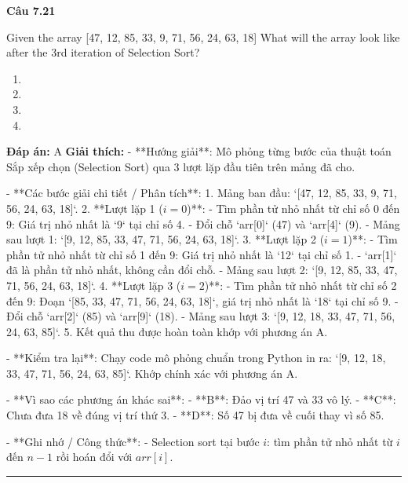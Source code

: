 \documentclass[11pt,a4paper]{article}
\newenvironment{question}[1]{%
  \par\vspace{1em}\noindent\textbf{\large Câu #1}\par\vspace{0.4em}
}{%
  \par\vspace{1em}\hrule\vspace{0.6em}
}
\newenvironment{choices}{%
  \begin{enumerate}[label=\textbf{\Alph*.},leftmargin=2.2em,itemsep=2pt,topsep=3pt]
}{%
  \end{enumerate}
}
\newcommand{\choice}{\item}
\begin{document}
\begin{question}{7.21}
Given the array [47, 12, 85, 33, 9, 71, 56, 24, 63, 18]
What will the array look like after the 3rd iteration of Selection Sort?
\begin{choices}
\choice [9, 12, 18, 33, 47, 71, 56, 24, 63, 85]
\choice [9, 12, 18, 47, 33, 71, 56, 24, 63, 85]
\choice [9, 12, 33, 18, 47, 71, 56, 24, 63, 85]
\choice [9, 12, 18, 33, 85, 71, 56, 24, 63, 47]
\end{choices}
\textbf{Đáp án:} A
\textbf{Giải thích:} - **Hướng giải**:
  Mô phỏng từng bước của thuật toán Sắp xếp chọn (Selection Sort) qua 3 lượt lặp đầu tiên trên mảng đã cho.

- **Các bước giải chi tiết / Phân tích**:
  1. Mảng ban đầu: `[47, 12, 85, 33, 9, 71, 56, 24, 63, 18]`.
  2. **Lượt lặp 1 (\(i = 0\))**:
     - Tìm phần tử nhỏ nhất từ chỉ số 0 đến 9: Giá trị nhỏ nhất là `9` tại chỉ số 4.
     - Đổi chỗ `arr[0]` (47) và `arr[4]` (9).
     - Mảng sau lượt 1: `[9, 12, 85, 33, 47, 71, 56, 24, 63, 18]`.
  3. **Lượt lặp 2 (\(i = 1\))**:
     - Tìm phần tử nhỏ nhất từ chỉ số 1 đến 9: Giá trị nhỏ nhất là `12` tại chỉ số 1.
     - `arr[1]` đã là phần tử nhỏ nhất, không cần đổi chỗ.
     - Mảng sau lượt 2: `[9, 12, 85, 33, 47, 71, 56, 24, 63, 18]`.
  4. **Lượt lặp 3 (\(i = 2\))**:
     - Tìm phần tử nhỏ nhất từ chỉ số 2 đến 9: Đoạn `[85, 33, 47, 71, 56, 24, 63, 18]`, giá trị nhỏ nhất là `18` tại chỉ số 9.
     - Đổi chỗ `arr[2]` (85) và `arr[9]` (18).
     - Mảng sau lượt 3: `[9, 12, 18, 33, 47, 71, 56, 24, 63, 85]`.
  5. Kết quả thu được hoàn toàn khớp với phương án A.

- **Kiểm tra lại**:
  Chạy code mô phỏng chuẩn trong Python in ra:
  `[9, 12, 18, 33, 47, 71, 56, 24, 63, 85]`.
  Khớp chính xác với phương án A.

- **Vì sao các phương án khác sai**:
  - **B**: Đảo vị trí 47 và 33 vô lý.
  - **C**: Chưa đưa 18 về đúng vị trí thứ 3.
  - **D**: Số 47 bị đưa về cuối thay vì số 85.

- **Ghi nhớ / Công thức**:
  - Selection sort tại bước \(i\): tìm phần tử nhỏ nhất từ \(i\) đến \(n-1\) rồi hoán đổi với \(arr[i]\).
\end{question}
\end{document}
